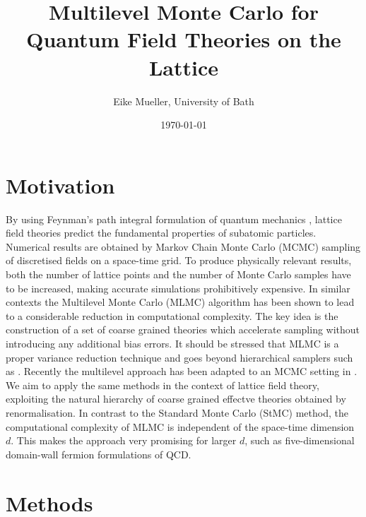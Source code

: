 \documentclass[11pt]{article}
\author{Eike Mueller, University of Bath}
\date{\today}
\title{Multilevel Monte Carlo for Quantum Field Theories on the Lattice}
\begin{document}
\maketitle
\section{Motivation}
By using Feynman's path integral formulation of quantum mechanics \cite{Feynman2010}, lattice field theories predict the fundamental properties of subatomic particles. Numerical results are obtained by Markov Chain Monte Carlo (MCMC) sampling of discretised fields on a space-time grid. To produce physically relevant results, both the number of lattice points and the number of Monte Carlo samples have to be increased, making accurate simulations prohibitively expensive. In similar contexts the Multilevel Monte Carlo (MLMC) algorithm \cite{Giles2015} has been shown to lead to a considerable reduction in computational complexity. The key idea is the construction of a set of coarse grained theories which accelerate sampling without introducing any additional bias errors. It should be stressed that MLMC is a proper variance reduction technique and goes beyond hierarchical samplers such as \cite{Faas1986}.
Recently the multilevel approach has been adapted to an MCMC setting in \cite{Dodwell2015}. We aim to apply the same methods in the context of lattice field theory, exploiting the natural hierarchy of coarse grained effectve theories obtained by renormalisation. In contrast to the Standard Monte Carlo (StMC) method, the computational complexity of MLMC is independent of the space-time dimension $d$. This makes the approach very promising for larger $d$, such as five-dimensional domain-wall fermion formulations \cite{Kaplan1992} of QCD. 
\section{Methods}

\end{document}
